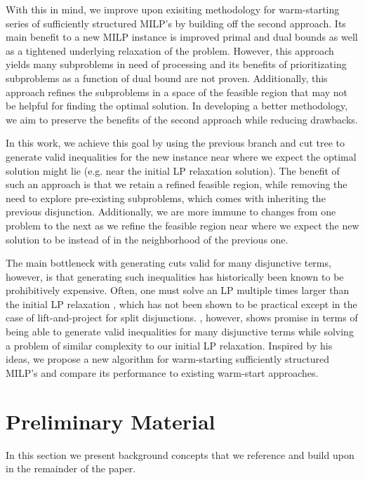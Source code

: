 \documentclass[10pt]{article}
\begin{document}
	With this in mind, we improve upon exisiting methodology for warm-starting series of sufficiently structured MILP's by building off the second approach. Its main benefit to a new MILP instance is improved primal and dual bounds as well as a tightened underlying relaxation of the problem. However, this approach yields many subproblems in need of processing and its benefits of prioritizating subproblems as a function of dual bound are not proven. Additionally, this approach refines the subproblems in a space of the feasible region that may not be helpful for finding the optimal solution. In developing a better methodology, we aim to preserve the benefits of the second approach while reducing drawbacks.
	
	In this work, we achieve this goal by using the previous branch and cut tree to generate valid inequalities for the new instance near where we expect the optimal solution might lie (e.g. near the initial LP relaxation solution). The benefit of such an approach is that we retain a refined feasible region, while removing the need to explore pre-existing subproblems, which comes with inheriting the previous disjunction. Additionally, we are more immune to changes from one problem to the next as we refine the feasible region near where we expect the new solution to be instead of in the neighborhood of the previous one.
	
	The main bottleneck with generating cuts valid for many disjunctive terms, however, is that generating such inequalities has historically been known to be prohibitively expensive. Often, one must solve an LP multiple times larger than the initial LP relaxation \cite{liftproject}, which has not been shown to be practical except in the case of lift-and-project for split disjunctions. \cite{aleks}, however, shows promise in terms of being able to generate valid inequalities for many disjunctive terms while solving a problem of similar complexity to our initial LP relaxation. Inspired by his ideas, we propose a new algorithm for warm-starting sufficiently structured MILP's and compare its performance to existing warm-start approaches.	
	
	\section{Preliminary Material} \label{s:prelim}
	In this section we present background concepts that we reference and build upon in the remainder of the paper.
	
\end{document}
